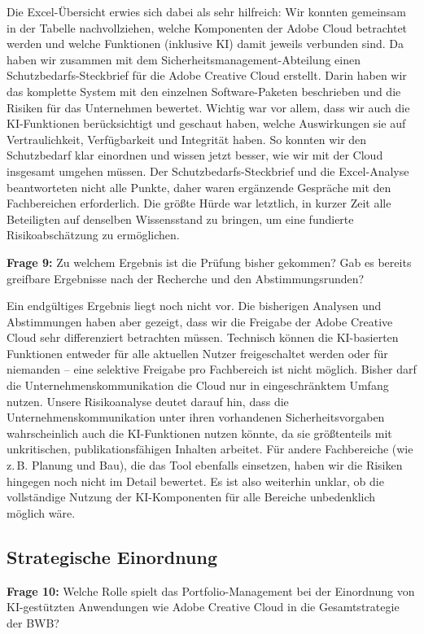 \documentclass[
    12pt, 
    a4paper,
    ]{scrartcl} %
\begin{document}
Die Excel-Übersicht erwies sich dabei als sehr hilfreich: Wir konnten gemeinsam in der Tabelle nachvollziehen, welche Komponenten der Adobe Cloud betrachtet werden und welche Funktionen (inklusive KI) damit jeweils verbunden sind. Da haben wir zusammen mit dem Sicherheitsmanagement-Abteilung einen Schutzbedarfs-Steckbrief für die Adobe Creative Cloud erstellt. Darin haben wir das komplette System mit den einzelnen Software-Paketen beschrieben und die Risiken für das Unternehmen bewertet. Wichtig war vor allem, dass wir auch die KI-Funktionen berücksichtigt und geschaut haben, welche Auswirkungen sie auf Vertraulichkeit, Verfügbarkeit und Integrität haben. So konnten wir den Schutzbedarf klar einordnen und wissen jetzt besser, wie wir mit der Cloud insgesamt umgehen müssen. Der Schutzbedarfs-Steckbrief und die Excel-Analyse beantworteten nicht alle Punkte, daher waren ergänzende Gespräche mit den Fachbereichen erforderlich. Die größte Hürde war letztlich, in kurzer Zeit alle Beteiligten auf denselben Wissensstand zu bringen, um eine fundierte Risikoabschätzung zu ermöglichen.  

\textbf{Frage 9:} Zu welchem Ergebnis ist die Prüfung bisher gekommen? Gab es bereits greifbare Ergebnisse nach der Recherche und den Abstimmungsrunden?  

Ein endgültiges Ergebnis liegt noch nicht vor. Die bisherigen Analysen und Abstimmungen haben aber gezeigt, dass wir die Freigabe der Adobe Creative Cloud sehr differenziert betrachten müssen. Technisch können die KI-basierten Funktionen entweder für alle aktuellen Nutzer freigeschaltet werden oder für niemanden – eine selektive Freigabe pro Fachbereich ist nicht möglich. Bisher darf die Unternehmenskommunikation die Cloud nur in eingeschränktem Umfang nutzen. Unsere Risikoanalyse deutet darauf hin, dass die Unternehmenskommunikation unter ihren vorhandenen Sicherheitsvorgaben wahrscheinlich auch die KI-Funktionen nutzen könnte, da sie größtenteils mit unkritischen, publikationsfähigen Inhalten arbeitet. Für andere Fachbereiche (wie z.\,B. Planung und Bau), die das Tool ebenfalls einsetzen, haben wir die Risiken hingegen noch nicht im Detail bewertet. Es ist also weiterhin unklar, ob die vollständige Nutzung der KI-Komponenten für alle Bereiche unbedenklich möglich wäre.  

\subsection*{Strategische Einordnung}

\textbf{Frage 10:} Welche Rolle spielt das Portfolio-Management bei der Einordnung von KI-gestützten Anwendungen wie Adobe Creative Cloud in die Gesamtstrategie der BWB?  
\end{document}
